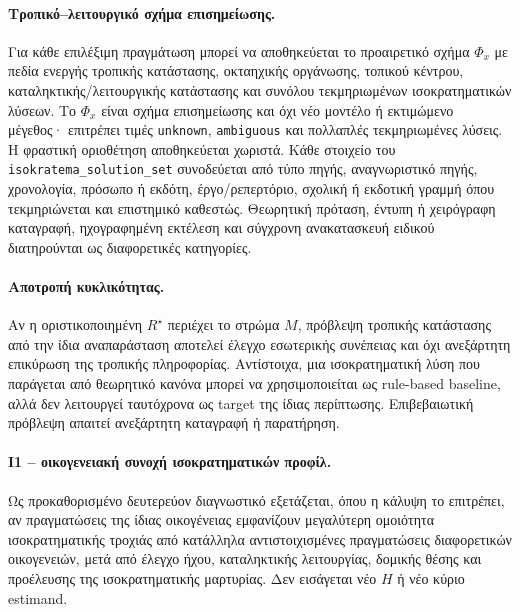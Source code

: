 \documentclass[11pt,a4paper]{article}
\begin{document}
\paragraph{Τροπικό--λειτουργικό σχήμα επισημείωσης.} Για κάθε επιλέξιμη πραγμάτωση μπορεί να αποθηκεύεται το προαιρετικό σχήμα $\Phi_x$ με πεδία ενεργής τροπικής κατάστασης, οκταηχικής οργάνωσης, τοπικού κέντρου, καταληκτικής/λειτουργικής κατάστασης και συνόλου τεκμηριωμένων ισοκρατηματικών λύσεων. Το $\Phi_x$ είναι σχήμα επισημείωσης και όχι νέο μοντέλο ή εκτιμώμενο μέγεθος· επιτρέπει τιμές \texttt{unknown}, \texttt{ambiguous} και πολλαπλές τεκμηριωμένες λύσεις. Η φραστική οριοθέτηση αποθηκεύεται χωριστά. Κάθε στοιχείο του \texttt{isokratema\_solution\_set} συνοδεύεται από τύπο πηγής, αναγνωριστικό πηγής, χρονολογία, πρόσωπο ή εκδότη, έργο/ρεπερτόριο, σχολική ή εκδοτική γραμμή όπου τεκμηριώνεται και επιστημικό καθεστώς. Θεωρητική πρόταση, έντυπη ή χειρόγραφη καταγραφή, ηχογραφημένη εκτέλεση και σύγχρονη ανακατασκευή ειδικού διατηρούνται ως διαφορετικές κατηγορίες.

\paragraph{Αποτροπή κυκλικότητας.} Αν η οριστικοποιημένη $R^\star$ περιέχει το στρώμα $M$, πρόβλεψη τροπικής κατάστασης από την ίδια αναπαράσταση αποτελεί έλεγχο εσωτερικής συνέπειας και όχι ανεξάρτητη επικύρωση της τροπικής πληροφορίας. Αντίστοιχα, μια ισοκρατηματική λύση που παράγεται από θεωρητικό κανόνα μπορεί να χρησιμοποιείται ως rule-based baseline, αλλά δεν λειτουργεί ταυτόχρονα ως target της ίδιας περίπτωσης. Επιβεβαιωτική πρόβλεψη απαιτεί ανεξάρτητη καταγραφή ή παρατήρηση.

\paragraph{I1 -- οικογενειακή συνοχή ισοκρατηματικών προφίλ.} Ως προκαθορισμένο δευτερεύον διαγνωστικό εξετάζεται, όπου η κάλυψη το επιτρέπει, αν πραγματώσεις της ίδιας οικογένειας εμφανίζουν μεγαλύτερη ομοιότητα ισοκρατηματικής τροχιάς από κατάλληλα αντιστοιχισμένες πραγματώσεις διαφορετικών οικογενειών, μετά από έλεγχο ήχου, καταληκτικής λειτουργίας, δομικής θέσης και προέλευσης της ισοκρατηματικής μαρτυρίας. Δεν εισάγεται νέο $H$ ή νέο κύριο estimand.
\end{document}
